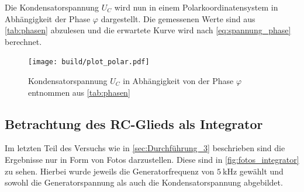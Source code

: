 Die Kondensatorspannung $U_C$ wird nun in einem Polarkoordinatensystem in Abhängigkeit der Phase $\varphi$ dargestellt. Die gemessenen Werte sind aus \autoref{tab:phasen} abzulesen und die erwartete Kurve wird nach \autoref{eq:spannung_phase} berechnet.

\begin{figure}
    \centering
    \texttt{[image: build/plot\_polar.pdf]}
    \caption{Kondensatorspannung $U_C$ in Abhängigkeit von der Phase $\varphi$ entnommen aus \autoref{tab:phasen}}
    \label{fig:plot_polar}
\end{figure}

\subsection{Betrachtung des RC-Glieds als Integrator}
\label{sec:Auswertung_Integrator}

Im letzten Teil des Versuchs wie in \autoref{sec:Durchführung_3} beschrieben sind die Ergebnisse nur in Form von Fotos darzustellen. Diese sind in \autoref{fig:fotos_integrator} zu sehen. Hierbei wurde jeweils die Generatorfrequenz von $\SI{5}{\kilo\hertz}$ gewählt und sowohl die Generatorspannung als auch die Kondensatorspannung abgebildet.

